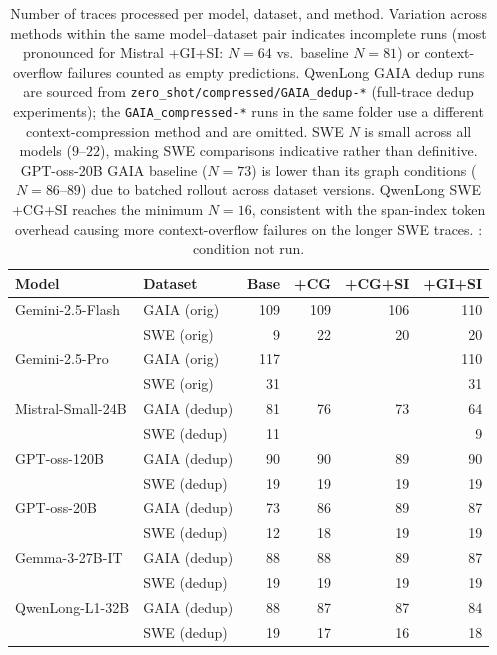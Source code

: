 \begin{table}[t]
\centering
\small
\setlength{\tabcolsep}{5pt}
\renewcommand{\arraystretch}{1.1}
\begin{tabular}{ll rrrr}
\toprule
\textbf{Model} & \textbf{Dataset} & \textbf{Base} & \textbf{+CG} & \textbf{+CG+SI} & \textbf{+GI+SI} \\
\midrule
Gemini-2.5-Flash      & GAIA (orig)    & 109 & 109 & 106 & 110 \\
                      & SWE  (orig)    &   9 &  22 &  20 &  20 \\
\midrule
Gemini-2.5-Pro        & GAIA (orig)    & 117 & \text{---} & \text{---} & 110 \\
                      & SWE  (orig)    &  31 & \text{---} & \text{---} &  31 \\
\midrule
Mistral-Small-24B     & GAIA (dedup)   &  81 &  76 &  73 &  64 \\
                      & SWE  (dedup)   &  11 & \text{---} & \text{---} &   9 \\
\midrule
GPT-oss-120B          & GAIA (dedup)   &  90 &  90 &  89 &  90 \\
                      & SWE  (dedup)   &  19 &  19 &  19 &  19 \\
\midrule
GPT-oss-20B           & GAIA (dedup)   &  73 &  86 &  89 &  87 \\
                      & SWE  (dedup)   &  12 &  18 &  19 &  19 \\
\midrule
Gemma-3-27B-IT        & GAIA (dedup)   &  88 &  88 &  89 &  87 \\
                      & SWE  (dedup)   &  19 &  19 &  19 &  19 \\
\midrule
QwenLong-L1-32B       & GAIA (dedup)   &  88 &  87 &  87 &  84 \\
                      & SWE  (dedup)   &  19 &  17 &  16 &  18 \\
\bottomrule
\end{tabular}
\caption{%
  Number of traces processed per model, dataset, and method.
  Variation across methods within the same model--dataset pair indicates
  incomplete runs (most pronounced for Mistral +GI+SI: $N{=}64$ vs.\
  baseline $N{=}81$) or context-overflow failures counted as empty
  predictions.
  QwenLong GAIA dedup runs are sourced from \texttt{zero\_shot/compressed/GAIA\_dedup-*}
  (full-trace dedup experiments); the \texttt{GAIA\_compressed-*} runs
  in the same folder use a different context-compression method and are omitted.
  SWE $N$ is small across all models ($9$--$22$), making SWE comparisons
  indicative rather than definitive.
  GPT-oss-20B GAIA baseline ($N{=}73$) is lower than its graph conditions
  ($N{=}86$--$89$) due to batched rollout across dataset versions.
  QwenLong SWE +CG+SI reaches the minimum $N{=}16$, consistent with the
  span-index token overhead causing more context-overflow failures on the
  longer SWE traces.
  \text{---}: condition not run.%
}
\label{tab:trace_coverage}
\end{table}
